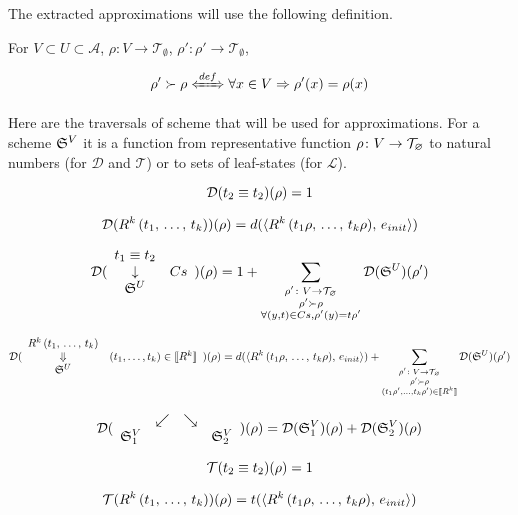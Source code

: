 The extracted approximations will use the following definition.

\begin{definition}
For $V \subset U \subset \mathcal{A}$, $\rho \colon V \to \mathcal{T}_{\emptyset}$, $\rho' \colon \rho' \to \mathcal{T}_{\emptyset}$,

\[ \rho' \succ \rho \xLeftrightarrow{def}  \forall x \in V \Rightarrow \rho'(x) = \rho(x) \]
\end{definition}

Here are the traversals of scheme that will be used for approximations. For a scheme $\mathfrak{S}^{V}$ it is a function from representative function $\rho \colon V \to \mathcal{T}_{\varnothing}$ to natural numbers (for $\mathcal{D}$ and $\mathcal{T}$) or to sets of leaf-states (for $\mathcal{L}$).

\[ \mathcal{D}(t_2 \equiv t_2)(\rho) = 1  \]

\[ \mathcal{D}(R^k\,(t_1, \, \dots, \, t_k))(\rho) = d(\langle R^k\,(t_1 \rho, \, \dots, \, t_k \rho) ,\, e_{init} \rangle) \]

\[ \mathcal{D}( \begin{array}{cl} t_1 \equiv t_2 \\ \downarrow & Cs \\ \mathfrak{S}^{U} \end{array} )(\rho) = 1 +
      \sum\limits_{\substack{ \rho' \colon V \to \mathcal{T}_{\varnothing} \\
                                      \rho' \succ \rho \\
                                      \forall (y, t) \in Cs, \rho'(y) = t \rho'  }}
           \mathcal{D}(\mathfrak{S}^{U})(\rho')  \]

\[ \mathcal{D}( \begin{array}{cl} R^k\,(t_1, \, \dots, \, t_k) \\ \Downarrow &  (t_1, \dots, t_k) \in \llbracket R^k \rrbracket   \\ \mathfrak{S}^{U} \end{array} )(\rho) =
      d(\langle R^k\,(t_1 \rho, \, \dots, \, t_k \rho) ,\, e_{init} \rangle) +
      \sum\limits_{\substack{ \rho' \colon V \to \mathcal{T}_{\varnothing} \\
                                      \rho' \succ \rho \\
                                      (t_1 \rho', \dots, t_k \rho') \in \llbracket R^k \rrbracket  }}
           \mathcal{D}(\mathfrak{S}^{U})(\rho')  \]

\[ \mathcal{D}(\begin{array}{cccc} & \swarrow & \searrow \\ \mathfrak{S}_1^{V} & & & \mathfrak{S}_2^{V} \end{array})(\rho) =
      \mathcal{D}(\mathfrak{S}_1^{V})(\rho) + \mathcal{D}(\mathfrak{S}_2^{V})(\rho) \]
      
\[ \mathcal{T}(t_2 \equiv t_2)(\rho) = 1  \]

\[ \mathcal{T}(R^k\,(t_1, \, \dots, \, t_k))(\rho) = t(\langle R^k\,(t_1 \rho, \, \dots, \, t_k \rho) ,\, e_{init} \rangle) \]

